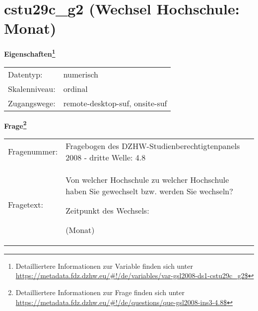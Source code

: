
    \setcounter{footnote}{0}

    \vspace*{-1.8cm}
	\section{cstu29c\_g2 (Wechsel Hochschule: Monat)}
	\label{section:cstu29c_g2}



    \vspace*{0.5cm}
    \noindent\textbf{Eigenschaften\footnote{Detailliertere Informationen zur Variable finden sich unter
		\url{https://metadata.fdz.dzhw.eu/\#!/de/variables/var-gsl2008-ds1-cstu29c_g2$}}}\\
	\begin{tabularx}{\hsize}{@{}lX}
	Datentyp: & numerisch \\
	Skalenniveau: & ordinal \\
	Zugangswege: &
	  remote-desktop-suf, 
	  onsite-suf
 \\
    \end{tabularx}



				\vspace*{0.5cm}
                \noindent\textbf{Frage\footnote{Detailliertere Informationen zur Frage finden sich unter
		              \url{https://metadata.fdz.dzhw.eu/\#!/de/questions/que-gsl2008-ins3-4.8$}}}\\
				\begin{tabularx}{\hsize}{@{}lX}
					Fragenummer: &
					  Fragebogen des DZHW-Studienberechtigtenpanels 2008 - dritte Welle:
					  4.8
 \\
					Fragetext: & Von welcher Hochschule zu welcher Hochschule haben Sie gewechselt bzw. werden Sie wechseln?\par  Zeitpunkt des Wechsels:\par  (Monat) \\
				\end{tabularx}





